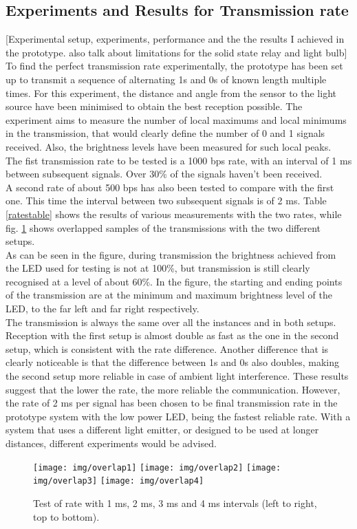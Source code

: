 \subsection{Experiments and Results for Transmission rate}
\label{tr:rate:exp}
[Experimental setup, experiments, performance and the the results I achieved in the prototype. also talk about limitations for the solid state relay and light bulb]\\
To find the perfect transmission rate experimentally, the prototype has been set up to transmit a sequence of alternating 1s and 0s of known length multiple times.
For this experiment, the distance and angle from the sensor to the light source have been minimised to obtain the best reception possible.
The experiment aims to measure the number of local maximums and local minimums in the transmission, that would clearly define the number of 0 and 1 signals received.
Also, the brightness levels have been measured for such local peaks.\\
The fist transmission rate to be tested is a 1000 bps rate, with an interval of 1 ms between subsequent signals.
Over 30\% of the signals haven't been received.\\
A second rate of about 500 bps has also been tested to compare with the first one.
This time the interval between two subsequent signals is of 2 ms.
Table \ref{ratestable} shows the results of various measurements with the two rates, while fig. \ref{fig:txpeak} shows overlapped samples of the transmissions with the two different setups.\\
As can be seen in the figure, during transmission the brightness achieved from the LED used for testing is not at 100\%, but transmission is still clearly recognised at a level of about 60\%. 
In the figure, the starting and ending points of the transmission are at the minimum and maximum brightness level of the LED, to the far left and far right respectively.\\
The transmission is always the same over all the instances and in both setups.
Reception with the first setup is almost double as fast as the one in the second setup, which is consistent with the rate difference.
Another difference that is clearly noticeable is that the difference between 1s and 0s also doubles, making the second setup more reliable in case of ambient light interference. 
These results suggest that the lower the rate, the more reliable the communication.
However, the rate of 2 ms per signal has been chosen to be final transmission rate in the prototype system with the low power LED, being the fastest reliable rate.
With a system that uses a different light emitter, or designed to be used at longer distances, different experiments would be advised.
\begin{figure}[hbt]
\centering
  \texttt{[image: img/overlap1]}
  \texttt{[image: img/overlap2]}
  \texttt{[image: img/overlap3]}
  \texttt{[image: img/overlap4]}
  \caption{Test of rate with 1 ms, 2 ms, 3 ms and 4 ms intervals (left to right, top to bottom).}
  \label{fig:txpeak}
\end{figure}

